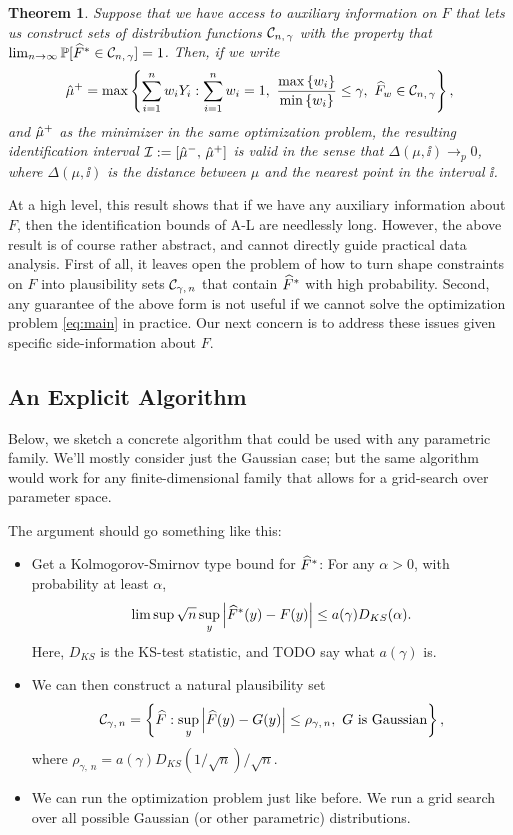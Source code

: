 \documentclass{article}
\theoremstyle{plain}
\newtheorem{theo}[prop]{Theorem}
\theoremstyle{definition}
\theoremstyle{remark}
\begin{document}
\begin{theo}
\label{theo:main}
Suppose that we have access to auxiliary information on $F$ that lets us construct
sets of distribution functions $\mathcal{C}_{n, \, \gamma}$ with the property that
$\lim_{n \rightarrow \infty} \mathbb{P}[\widehat{F}^* \in \mathcal{C}_{n, \, \gamma}] = 1$.
Then, if we write
\begin{equation}
\label{eq:main}
\hmu^+ = \max\cb{\sum_{i = 1}^n w_i Y_i : \sum_{i = 1}^n w_i = 1, \ \frac{\max\cb{w_i}}{\min\cb{w_i}} \leq \gamma, \ \hF_w \in \cset_{n, \, \gamma}},
\end{equation}
and $\hat{\mu}^+$ as the minimizer in the same optimization problem,
the resulting identification interval $\mathcal{I} := [\hat{\mu}^-,\, \hat{\mu}^+]$ is
valid in the sense that $\Delta(\mu, \ii) \rightarrow_p 0$, where
$\Delta(\mu, \ii)$ is the distance between $\mu$ and the nearest point in the interval $\ii$.
\end{theo}

At a high level, this result shows that if we have any auxiliary information about $F$, then
the identification bounds of A-L are needlessly long.
However, the above result is of course rather abstract, and cannot directly guide practical data
analysis. First of all, it leaves open the problem of how to turn shape constraints on $F$
into plausibility sets $\mathcal{C}_{\gamma, \, n}$ that contain $\widehat{F}^*$ with high probability.
Second, any guarantee of the above form is not useful if we cannot solve the optimization
problem \eqref{eq:main} in practice.
Our next concern is to address these issues given specific side-information about $F$.

\subsection{An Explicit Algorithm}

Below, we sketch a concrete algorithm that could be used with any parametric family.
We'll mostly consider just the Gaussian case; but the same algorithm would work for
any finite-dimensional family that allows for a grid-search over parameter space.

The argument should go something like this:
\begin{itemize}
\item Get a Kolmogorov-Smirnov type bound for $\widehat{F}^*$: For any $\alpha > 0$,
with probability at least $\alpha$,
$$ \limsup \sqrt{n} \sup_{y} \left\lvert\widehat{F}^*(y) - F(y)\right\rvert \leq a(\gamma) D_{KS}(\alpha). $$
Here, $D_{KS}$ is the KS-test statistic, and TODO say what $a(\gamma)$ is.
\item We can then construct a natural plausibility set
$$ \mathcal{C}_{\gamma, \, n} = \left\{\widehat{F} : \sup_{y} \left\lvert\widehat{F}(y) - G(y)\right\rvert \leq \rho_{\gamma,\, n}, \ G \text{ is Gaussian}\right\}, $$
where $\rho_{\gamma, \, n} = a(\gamma) D_{KS}(1/\sqrt{n})/\sqrt{n}$.
\item We can run the optimization problem just like before. We run a grid search over all
possible Gaussian (or other parametric) distributions.
\end{itemize}
\end{document}
